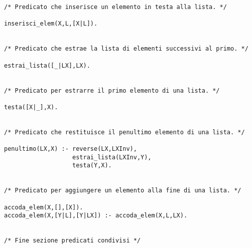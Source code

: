 \begin{verbatim}
/* Predicato che inserisce un elemento in testa alla lista. */

inserisci_elem(X,L,[X|L]).


/* Predicato che estrae la lista di elementi successivi al primo. */

estrai_lista([_|LX],LX).


/* Predicato per estrarre il primo elemento di una lista. */

testa([X|_],X).


/* Predicato che restituisce il penultimo elemento di una lista. */

penultimo(LX,X) :- reverse(LX,LXInv),
                   estrai_lista(LXInv,Y),
                   testa(Y,X).


/* Predicato per aggiungere un elemento alla fine di una lista. */

accoda_elem(X,[],[X]).
accoda_elem(X,[Y|L],[Y|LX]) :- accoda_elem(X,L,LX).


/* Fine sezione predicati condivisi */

\end{verbatim}